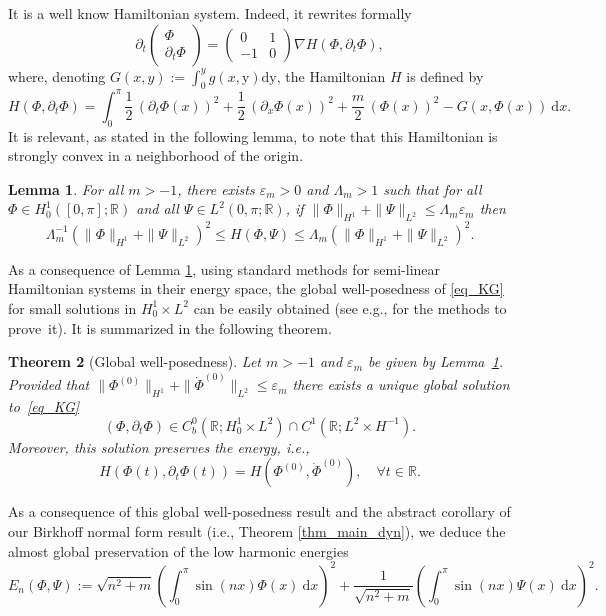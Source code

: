 \documentclass[11pt]{article}
\newcommand{\ie}{i.e.,\xspace}
\newcommand{\eg}{e.g.,\xspace}
\newtheorem{theorem}{Theorem}[section]
\newtheorem{lemma}[theorem]{Lemma}
\theoremstyle{definition}
\begin{document}
It is a well know Hamiltonian system. Indeed, it rewrites formally
\[
\partial_t \begin{pmatrix} \Phi \\ \partial_t \Phi \end{pmatrix} = \begin{pmatrix} 0 & 1 \\ -1 & 0 \end{pmatrix} \nabla H (\Phi,\partial_t \Phi),
\]
where, denoting $G(x,y):= \int_0^y g(x,\mathrm{y}) \mathrm{d}\mathrm{y}$, the Hamiltonian $H$ is defined by
\[
H(\Phi,\partial_t \Phi) = \int_0^\pi \frac12\,(\partial_t \Phi(x))^2 + \frac12\,(\partial_x \Phi(x))^2+\frac{m}2\, (\Phi(x))^2 - G(x,\Phi(x)) \ \mathrm{d}x.
\]
It is relevant, as stated in the following lemma, to note that this Hamiltonian is strongly convex in a neighborhood of the origin.
\begin{lemma}\label{lemma_Ham_KG_coer} For all $m>-1$, there exists $\varepsilon_m>0$ and $\Lambda_m>1$ such that for all $\Phi\in H^1_0([0,\pi];\mathbb{R})$ and all $\Psi \in L^2(0,\pi;\mathbb{R})$, if $\| \Phi\|_{H^1}+\|\Psi\|_{L^2}\leq \Lambda_m \varepsilon_m$ then
\[
\Lambda_m^{-1}(\| \Phi\|_{H^1}+\|\Psi\|_{L^2})^2 \leq H(\Phi,\Psi)\leq \Lambda_m (\| \Phi\|_{H^1}+\|\Psi\|_{L^2})^2.
\]
\end{lemma}

As a consequence of Lemma \ref{lemma_Ham_KG_coer}, using standard methods for semi-linear Hamiltonian systems in their energy space, the global well-posedness of \eqref{eq_KG} for small solutions in $H^1_0 \times L^2$ can be easily obtained (see \eg \cite{Caz03} for the methods to prove~it). It is summarized in the following theorem.
\begin{theorem}[Global well-posedness]
\label{thm_GWP_KG}
Let $m>-1$ and $\varepsilon_m$ be given by Lemma~\ref{lemma_Ham_KG_coer}. Provided that $\|\Phi^{(0)}\|_{H^1} +\|\dot{\Phi}^{(0)}\|_{ L^2} \leq \varepsilon_m$ there exists a unique global solution to~\eqref{eq_KG}
\[
(\Phi,\partial_t \Phi) \in C^0_b(\mathbb{R}; H^1_0 \times L^2) \cap C^1(\mathbb{R}; L^2 \times H^{-1}).
\]
Moreover, this solution preserves the energy, \ie
\[
H(\Phi(t),\partial_t \Phi(t)) = H(\Phi^{(0)},\dot{\Phi}^{(0)}), \quad \forall t\in \mathbb{R}.
\]
\end{theorem}

As a consequence of this global well-posedness result and the abstract corollary of our Birkhoff normal form result (\ie Theorem \ref{thm_main_dyn}), we deduce the almost global preservation of the low harmonic energies
\[
E_n(\Phi,\Psi):= \sqrt{n^2+m} \left(\int_0^\pi \sin(n x) \Phi(x) \ \mathrm{d}x \right)^2+ \frac1{\sqrt{n^2+m}} \left(\int_0^\pi \sin(n x) \Psi(x) \ \mathrm{d}x \right)^2.
\]
\end{document}
